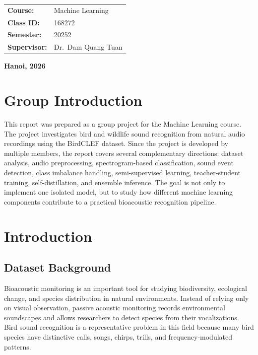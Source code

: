 \documentclass[a4paper,12pt]{article}
\begin{document}
\begin{center}
    \begin{tabular}{ll}
        \textbf{Course:} & Machine Learning
 \\
        \textbf{Class ID:} & 168272 \\
        \textbf{Semester:} & 20252 \\
        \textbf{Supervisor:} & Dr.\ Dam Quang Tuan \\
    \end{tabular}
\end{center}

\vfill

\begin{center}
    \textbf{Hanoi, 2026}
\end{center}

\tableofcontents
\newpage


\section*{Group Introduction}
This report was prepared as a group project for the Machine Learning course. The project investigates bird and wildlife sound recognition from natural audio recordings using the BirdCLEF dataset. Since the project is developed by multiple members, the report covers several complementary directions: dataset analysis, audio preprocessing, spectrogram-based classification, sound event detection, class imbalance handling, semi-supervised learning, teacher-student training, self-distillation, and ensemble inference. The goal is not only to implement one isolated model, but to study how different machine learning components contribute to a practical bioacoustic recognition pipeline.

\section{Introduction}

\subsection{Dataset Background}
Bioacoustic monitoring is an important tool for studying biodiversity, ecological change, and species distribution in natural environments. Instead of relying only on visual observation, passive acoustic monitoring records environmental soundscapes and allows researchers to detect species from their vocalizations. Bird sound recognition is a representative problem in this field because many bird species have distinctive calls, songs, chirps, trills, and frequency-modulated patterns.
\end{document}
